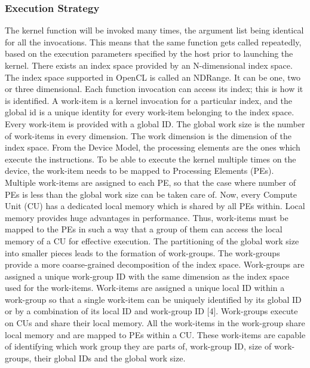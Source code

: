 \subsubsection{Execution Strategy}
The kernel function will be invoked many times, the argument list being identical for all the invocations. This means that the same function gets called repeatedly, based on the execution parameters specified by the host prior to launching the kernel.\newline\newline
There exists an index space provided by an N-dimensional index space. The index space supported in OpenCL is called an NDRange. It can be one, two or three dimensional. Each function invocation can access its index; this is how it is identified. A work-item is a kernel invocation for a particular index, and the global id is a unique identity for every work-item belonging to the index space. Every work-item is provided with a global ID. The global work size is the number of work-items in every dimension. The work dimension is the dimension of the index space.\newline\newline 
From the Device Model, the processing elements are the ones which execute the instructions. To be able to execute the kernel multiple times on the device, the work-item needs to be mapped to Processing Elements (PEs). Multiple work-items are assigned to each PE, so that the case where number of PEs is less than the global work size can be taken care of. \newline\newline
Now, every Compute Unit (CU) has a dedicated local memory which is shared by all PEs within. Local memory provides huge advantages in performance. Thus, work-items must be mapped to the PEs in such a way that a group of them can access the local memory of a CU for effective execution. The partitioning of the global work size into smaller pieces leads to the formation of work-groups. The work-groups provide a more coarse-grained decomposition of the index space. Work-groups are assigned a unique work-group ID with the same dimension as the index space used for the work-items. Work-items are assigned a unique local ID within a work-group so that a single work-item can be uniquely identified by its global ID or by a combination of its local ID and work-group ID [4]. \newline\newline
Work-groups execute on CUs and share their local memory. All the work-items in the work-group share local memory and are mapped to PEs within a CU. These work-items are capable of identifying which work group they are parts of, work-group ID, size of work-groups, their global IDs and the global work size. \newline\newline 
